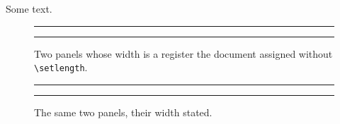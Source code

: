 \documentclass[twocolumn]{article}
\newlength\figw
\begin{document}
\columnwidth
Some text.

\begin{figure}
  \centering
  \rule{\figw}{1cm}
  \rule{\figw}{1cm}
  \caption{Two panels whose width is a register the document assigned without \texttt{\textbackslash setlength}.}
\end{figure}
\begin{figure}
  \centering
  \rule{0.45\columnwidth}{1cm}
  \rule{0.45\columnwidth}{1cm}
  \caption{The same two panels, their width stated.}
\end{figure}
\end{document}
